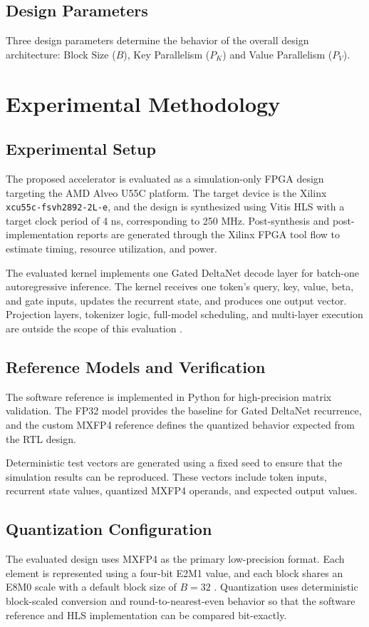 ﻿\documentclass[conference]{IEEEtran}
\begin{document}
\subsection{Design Parameters}
Three design parameters determine the behavior of the overall design architecture: Block Size ($B$), Key Parallelism ($P_K$) and Value Parallelism ($P_V$).

\section{Experimental Methodology}

\subsection{Experimental Setup}
The proposed accelerator is evaluated as a simulation-only FPGA design targeting the AMD Alveo U55C platform. The target device is the Xilinx \texttt{xcu55c-fsvh2892-2L-e}, and the design is synthesized using Vitis HLS with a target clock period of 4 ns, corresponding to 250 MHz. Post-synthesis and post-implementation reports are generated through the Xilinx FPGA tool flow to estimate timing, resource utilization, and power.

The evaluated kernel implements one Gated DeltaNet decode layer for batch-one autoregressive inference. The kernel receives one token's query, key, value, beta, and gate inputs, updates the recurrent state, and produces one output vector. Projection layers, tokenizer logic, full-model scheduling, and multi-layer execution are outside the scope of this evaluation \cite{b3,b10}.

\subsection{Reference Models and Verification}
The software reference is implemented in Python for high-precision matrix validation. The FP32 model provides the baseline for Gated DeltaNet recurrence, and the custom MXFP4 reference defines the quantized behavior expected from the RTL design.

Deterministic test vectors are generated using a fixed seed to ensure that the simulation results can be reproduced. These vectors include token inputs, recurrent state values, quantized MXFP4 operands, and expected output values.

\subsection{Quantization Configuration}
The evaluated design uses MXFP4 as the primary low-precision format. Each element is represented using a four-bit E2M1 value, and each block shares an E8M0 scale with a default block size of $B=32$ \cite{b12}. Quantization uses deterministic block-scaled conversion and round-to-nearest-even behavior so that the software reference and HLS implementation can be compared bit-exactly.
\end{document}
